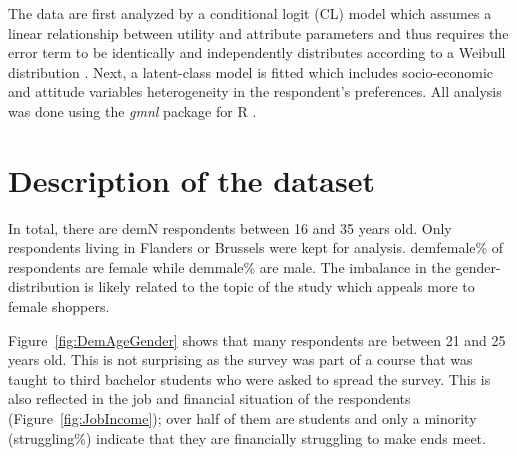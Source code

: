 \documentclass[review]{elsarticle}
\begin{document}
The data are first analyzed by a conditional logit (CL) model which assumes a linear relationship between utility and attribute parameters and thus requires the error term to be identically and independently distributes according to a Weibull distribution \citep{Mariel2013}. Next, a latent-class model is fitted which includes socio-economic and attitude variables heterogeneity in the respondent's preferences. All analysis was done using the \emph{gmnl} package for R \citep{sarrias2017multinomial}.

\section{Description of the dataset}\label{sec:data}
In total, there are \gls{demN} respondents between 16 and 35 years old. Only respondents living in Flanders or Brussels were kept for analysis.  \gls{demfemale}\% of respondents are female while \gls{demmale}\% are male. The imbalance in the gender-distribution is likely related to the topic of the study which appeals more to female shoppers.

Figure~\ref{fig:DemAgeGender} shows that many respondents are between 21 and 25 years old. This is not surprising as the survey was part of a course that was taught to third bachelor students who were asked to spread the survey. This is also reflected in the job and financial situation of the respondents (Figure~\ref{fig:JobIncome}); over half of them are students and only a minority (\gls{struggling}\%) indicate that they are financially struggling to make ends meet.
\end{document}
